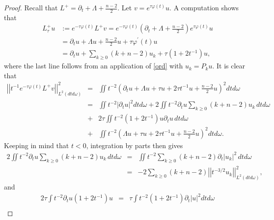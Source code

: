 \documentclass[11pt]{amsart}
\theoremstyle{plain}
\numberwithin{equation}{section}
\begin{document}
\begin{proof}
Recall that $L^+=\partial_t+\Lambda+\frac{n-2}{2}$.
Let $v=e^{\tau\varphi(t)}u$.
A computation shows that
\begin{align}
L^+_{\tau} u
&:= e^{- \tau {\varphi}{\left( {t} \right) }} L^+ v
= e^{- \tau {\varphi}{\left( {t} \right) }} {\left( {\partial_t+\Lambda+\frac{n-2}{2}} \right) } e^{\tau\varphi(t)}u \nonumber \\
&= \partial_t u
+ \Lambda u
+  \frac{n-2}{2} u
+ \tau {\varphi}^\prime{\left( {t} \right) } u \nonumber \\
&=  \partial_t u + \sum_{k \ge 0} {\left( {k+ n-2} \right) } u_k + \tau {\left( {1 + 2 t^{-1}} \right) } u,
\label{Lpt}
\end{align}
where the last line follows from an application of \eqref{ord} with $u_k = P_k u$.
It is clear that
\begin{eqnarray}
{\left\vert\left\vert {t^{-1}e^{-\tau\varphi(t)}L^+v}\right\vert\right\vert}^2_{L^2(dtd\omega)} &=&
\iint t^{-2}{\left( {\partial_t u+\Lambda u+\tau u+2\tau t^{-1} u +\frac{n-2}{2}u } \right) }^2 dtd\omega \nonumber \\
&=& \iint t^{-2} {\left\vert{\partial_t u}\right\vert}^2 dtd{\omega} +  2 \iint t^{-2}
{ \partial}_t u \sum_{k \ge 0} {\left( {k+ n-2} \right) } u_k \, dt d{\omega}
\nonumber \\
&+&  2 \tau \iint t^{-2}  {\left( {1 + 2 t^{-1}} \right) }
u { \partial}_t u \, dt d{\omega} \nonumber\\
&+& \iint t^{-2}{\left( {\Lambda u+\tau u+2\tau t^{-1} u +\frac{n-2}{2}
u} \right) }^2 dtd{\omega} .
\label{comb1}
\end{eqnarray}
 Keeping in mind that $t < 0$, integration by parts then gives
\begin{eqnarray}
2 \iint t^{-2} { \partial}_t u \sum_{k \ge 0} {\left( {k+ n-2} \right) } u_k \, dt d{\omega}
&=&  \iint t^{-2} \sum_{k \ge 0} {\left( {k+ n-2} \right) } { \partial}_t {\left\vert{u_k}\right\vert}^2 \, dt d{\omega} \nonumber \\
&=& - 2 \sum_{k \ge 0} {\left( {k+ n-2} \right) } {\left\vert\left\vert {t^{-3/2} u_k}\right\vert\right\vert}^2_{L^2{\left( { dt
d{\omega}} \right) }}, \label{ana1}
\end{eqnarray}
and
\begin{eqnarray}
 2 \tau \int t^{-2} { \partial}_t u {\left( {1 + 2 t^{-1}} \right) } u
&=& \tau \int t^{-2} {\left( {1 + 2 t^{-1}} \right) } { \partial}_t{\left\vert{u}\right\vert}^2 dt d{\omega} \nonumber\\

\end{eqnarray}
\end{proof}
\end{document}

